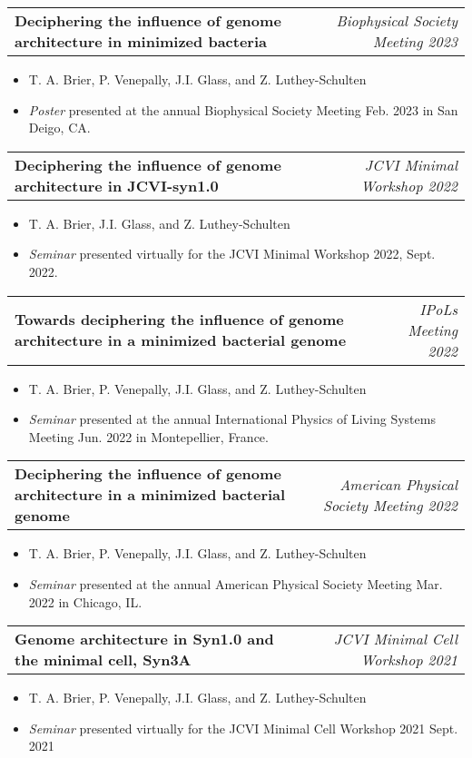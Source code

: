 \documentclass[letterpaper,10pt]{article}
\makeatletter
\newcommand{\experienceitemvspace}{3pt}
\newcommand{\resumeItem}[1]{
  \item{
    {#1 \vspace{-4pt}}
  }
}
\newcommand{\titleItem}[1]{
  \textbf{#1}
}
\newcommand{\resumeProjectHeading}[2]{
    \item
    \begin{tabular*}{0.97\textwidth}{l@{\extracolsep{\fill}}r}
      #1 & \textit{ #2} \\
    \end{tabular*}\vspace{-9pt}
}
\newcommand{\resumeItemListStart}{
\begin{itemize}}
\newcommand{\resumeItemListEnd}{
\end{itemize}\vspace{-8pt}}
\makeatother
\begin{document}
	\vspace{\experienceitemvspace}
	\resumeProjectHeading
	{\titleItem{{Deciphering the influence of genome architecture in minimized bacteria}}} {\textcolor{color2}{Biophysical Society Meeting 2023}}
	\vspace{2pt}
	\resumeItemListStart
	\resumeItem{\textcolor{color1}{T. A. Brier}, P. Venepally, J.I. Glass, and Z. Luthey-Schulten}
	\resumeItem{\emph{Poster} presented at the annual Biophysical Society Meeting Feb. 2023 in San Deigo, CA.}
	\resumeItemListEnd
	
	\vspace{\experienceitemvspace}
	\resumeProjectHeading
	{\titleItem{{Deciphering the influence of genome architecture in JCVI-syn1.0}}} {\textcolor{color2}{JCVI Minimal Workshop 2022}}
	\vspace{2pt}
	\resumeItemListStart
	\resumeItem{\textcolor{color1}{T. A. Brier}, J.I. Glass, and Z. Luthey-Schulten}
	\resumeItem{\emph{Seminar} presented virtually for the JCVI Minimal Workshop 2022, Sept. 2022.}
	\resumeItemListEnd
	
	\vspace{\experienceitemvspace}
	\resumeProjectHeading
	{\titleItem{{Towards deciphering the influence of genome architecture in a minimized bacterial genome}}} {\textcolor{color2}{IPoLs Meeting 2022}}
	\vspace{2pt}
	\resumeItemListStart
	\resumeItem{\textcolor{color1}{T. A. Brier}, P. Venepally, J.I. Glass, and Z. Luthey-Schulten}
	\resumeItem{\emph{Seminar} presented at the annual International Physics of Living Systems Meeting Jun. 2022 in Montepellier, France.}
	\resumeItemListEnd
	
	\vspace{\experienceitemvspace}
	\resumeProjectHeading
	{\titleItem{{Deciphering the influence of genome architecture in a minimized bacterial genome}}} {\textcolor{color2}{American Physical Society Meeting 2022}}
	\vspace{2pt}
	\resumeItemListStart
	\resumeItem{\textcolor{color1}{T. A. Brier}, P. Venepally, J.I. Glass, and Z. Luthey-Schulten}
	\resumeItem{\emph{Seminar} presented at the annual American Physical Society Meeting Mar. 2022 in Chicago, IL.}
	\resumeItemListEnd
	
	\vspace{\experienceitemvspace}
	\resumeProjectHeading
	{\titleItem{{Genome architecture in Syn1.0 and the minimal cell, Syn3A}}} {\textcolor{color2}{JCVI Minimal Cell Workshop 2021}}
	\vspace{2pt}
	\resumeItemListStart
	\resumeItem{\textcolor{color1}{T. A. Brier}, P. Venepally, J.I. Glass, and Z. Luthey-Schulten}
	\resumeItem{\emph{Seminar} presented virtually for the JCVI Minimal Cell Workshop 2021 Sept. 2021}
	\resumeItemListEnd
	
\end{document}

